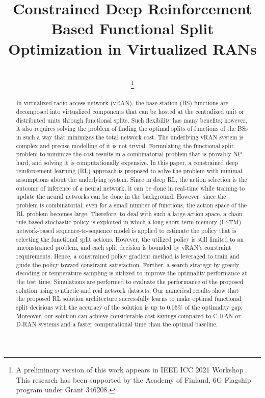 \documentclass[journal, final]{IEEEtran}
\title{Constrained Deep Reinforcement Based Functional Split Optimization in Virtualized RANs}
\author{\IEEEauthorblockN{Fahri Wisnu Murti, Samad Ali, and Matti Latva-aho}\\
\IEEEauthorblockA{
	Centre for Wireless Communications, University of Oulu, Finland}
\thanks{A preliminary version of this work appears in IEEE ICC 2021 Workshop \cite{murti_iccw_cdrs_vran}. This research has been supported by the Academy of Finland, 6G Flagship program under Grant 346208.}%
}
\newcommand{\thirdrev}[1]{{\color{black}#1}}
\begin{document}
	

\maketitle

\begin{abstract}
\thirdrev{In virtualized radio access network (vRAN), the base station (BS) functions are decomposed into virtualized components that can be hosted at the centralized unit or distributed units through functional splits. Such flexibility has many benefits; however, it also requires solving the problem of finding the optimal splits of functions of the BSs in such a way that minimizes the total network cost. The underlying vRAN system is complex and precise modelling of it is not trivial. Formulating the functional split problem to minimize the cost results in a combinatorial problem that is provably NP-hard, and solving it is computationally expensive. In this paper, a constrained deep reinforcement learning (RL) approach is proposed to solve the problem with minimal assumptions about the underlying system. Since in deep RL, the action selection is the outcome of inference of a neural network, it can be done in real-time while training to update the neural networks can be done in the background. However, since the problem is combinatorial, even for a small number of functions, the action space of the RL problem becomes large. Therefore, to deal with such a large action space, a chain rule-based stochastic policy is exploited in which a long short-term memory (LSTM) network-based sequence-to-sequence model is applied to estimate the policy that is selecting the functional split actions. However, the utilized policy is still limited to an unconstrained problem, and each split decision is bounded by vRAN’s constraint requirements. Hence, a constrained policy gradient method is leveraged to train and guide the policy toward constraint satisfaction. Further, a search strategy by greedy decoding or temperature sampling is utilized to improve the optimality performance at the test time. Simulations are performed to evaluate the performance of the proposed solution using synthetic and real network datasets. Our numerical results show that the proposed RL solution architecture successfully learns to make optimal functional split decisions with the accuracy of the solution is up to 0.05\% of the optimality gap. Moreover, our solution can achieve considerable cost savings compared to C-RAN or D-RAN systems and a faster computational time than the optimal baseline.}

\end{abstract}
\end{document}
